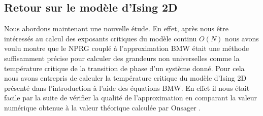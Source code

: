 \documentclass[10.5pt]{article}
\begin{document}
\begin{multicols}{2}


\newpage
\phantom{.}
\newpage


\section{Retour sur le modèle d'Ising 2D}

\label{sec:Ising}

Nous abordons maintenant une nouvelle étude. En effet, après nous être intéressés au calcul des exposants critiques du modèle continu $O(N)$ nous avons voulu montre que le NPRG couplé à l'approximation BMW était une méthode suffisamment précise pour calculer des grandeurs non universelles comme la température critique de la transition de phase d'un système donné. Pour cela nous avons entrepris de calculer la température critique du modèle d'Ising 2D présenté dans l'introduction à l'aide des équations BMW. En effet il nous était facile par la suite de vérifier la qualité de l'approximation en comparant la valeur numérique obtenue à la valeur théorique calculée par Onsager \cite{Onsager}. \\


\end{multicols}
\end{document}
